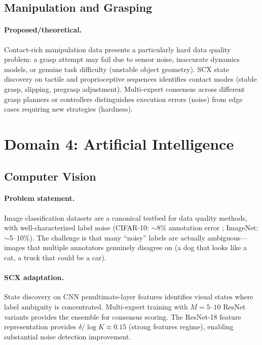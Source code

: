 \documentclass[twocolumn]{article}
\theoremstyle{definition}
\begin{document}
\subsection{Manipulation and Grasping}
\label{sec:manipulation}

\paragraph{Proposed/theoretical.}
Contact-rich manipulation data presents a particularly hard data quality problem: a grasp attempt may fail due to sensor noise, inaccurate dynamics models, or genuine task difficulty (unstable object geometry). SCX state discovery on tactile and proprioceptive sequences identifies contact modes (stable grasp, slipping, pregrasp adjustment). Multi-expert consensus across different grasp planners or controllers distinguishes execution errors (noise) from edge cases requiring new strategies (hardness).

\section{Domain 4: Artificial Intelligence}

\subsection{Computer Vision}

\paragraph{Problem statement.}
Image classification datasets are a canonical testbed for data quality methods, with well-characterized label noise (CIFAR-10: $\sim$8\% annotation error \cite{northcutt2021}; ImageNet: $\sim$5--10\%). The challenge is that many ``noisy'' labels are actually ambiguous---images that multiple annotators genuinely disagree on (a dog that looks like a cat, a truck that could be a car).

\paragraph{SCX adaptation.}
State discovery on CNN penultimate-layer features identifies visual states where label ambiguity is concentrated. Multi-expert training with $M = 5$--$10$ ResNet variants provides the ensemble for consensus scoring. The ResNet-18 feature representation provides $\delta/\log K \approx 0.15$ (strong features regime), enabling substantial noise detection improvement.
\end{document}
